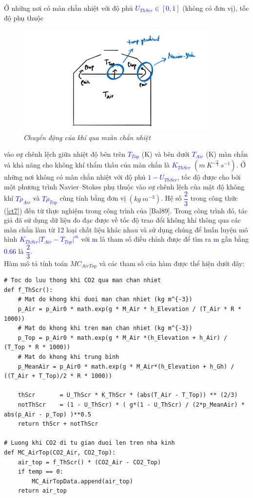 \documentclass[13pt,a4paper]{article}
\begin{document}
			Ở những nơi có màn chắn nhiệt với độ phủ \textcolor{blue}{$U_{ThScr} \in [0, 1]$} (không có đơn vị), tốc độ phụ thuộc
			\begin{figure}[h!]
				\begin{center}
					\includegraphics[width=10cm]{co2_move.png}
					\caption{\textit{Chuyển động của khí  qua mzàn chắn nhiệt}}
					\label{h7}
				\end{center}
			\end{figure}
			vào sự chênh lệch giữa nhiệt độ bên trên \textcolor{blue}{$T_{Top}$} (K) và bên dưới \textcolor{blue}{$T_{Air}$} (K) màn chắn và khả năng cho không khí thẩm thấu của màn chắn là \textcolor{blue}{$K_{ThScr}$} $(m\ K^{-\frac{2}{3}}\ s^{-1})$. Ở những nơi không có màn chắn nhiệt với độ phủ \textcolor{blue}{$1 - U_{ThScr}$}, tốc độ được cho bởi một phương trình Navier–Stokes phụ thuộc vào sự chênh lệch của mật độ không khí \textcolor{blue}{$T\rho_{Air}$} và \textcolor{blue}{$T\rho_{Top}$} cùng tính bằng đơn vị $(kg\ m^{-3})$. Hệ số \textcolor{blue}{$\dfrac{2}{3}$} trong công thức (\ref{ct7}) đến từ thực nghiệm trong công trình của [Bal89]. Trong công trình đó, tác giả đã sử dụng dữ liệu đo đạc được về tốc độ trao đổi không khí thông qua	các màn chắn làm từ 12 loại chất liệu khác nhau và sử dụng chúng để huấn luyện mô hình \textcolor{blue}{$K_{ThScr}{\vert T_{Air} - T_{Top} \vert}^m$} với \textcolor{blue}{m} là tham số điều chỉnh được để tìm ra \textcolor{blue}{m} gần bằng \textcolor{blue}{$0.66$} là \textcolor{blue}{$\dfrac{2}{3}$}.\\
			Hàm mô tả tính toán $MC_{AirTop}$ và các tham số của hàm được thể hiện dưới đây:
\begin{lstlisting}
# Toc do luu thong khi CO2 qua man chan nhiet
def f_ThScr():
	# Mat do khong khi duoi man chan nhiet (kg m^{-3})
	p_Air = p_Air0 * math.exp(g * M_Air * h_Elevation / (T_Air * R * 1000))  
	# Mat do khong khi tren man chan nhiet (kg m^{-3})
	p_Top = p_Air0 * math.exp(g * M_Air *(h_Elevation + h_Air) / (T_Top * R * 1000))  
	# Mat do khong khi trung binh
	p_MeanAir = p_Air0 * math.exp(g * M_Air*(h_Elevation + h_Gh) / ((T_Air + T_Top)/2 * R * 1000))
	
	thScr       = U_ThScr * K_ThScr * (abs(T_Air - T_Top)) ** (2/3)
	notThScr    = (1 - U_ThScr) * ( g*(1 - U_ThScr) / (2*p_MeanAir) * abs(p_Air - p_Top) )**0.5
	return thScr + notThScr
	
# Luong khi CO2 di tu gian duoi len tren nha kinh
def MC_AirTop(CO2_Air, CO2_Top):
	air_top = f_ThScr() * (CO2_Air - CO2_Top)
	if temp == 0: 
		MC_AirTopData.append(air_top)
	return air_top
\end{lstlisting}
\end{document}
